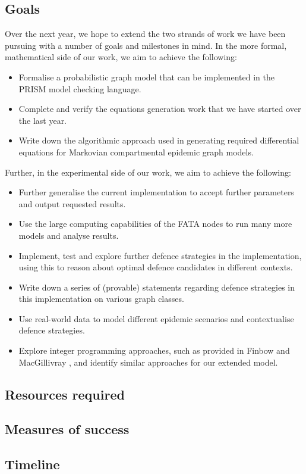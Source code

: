 \documentclass[../report.tex]{subfiles}
\begin{document}
\subsection{Goals}

Over the next year, we hope to extend the two strands of work we have been pursuing with a number of goals and milestones in mind. In the more formal, mathematical side of our work, we aim to achieve the following:
\begin{itemize}
	\item Formalise a probabilistic graph model that can be implemented in the PRISM model checking language.
	\item Complete and verify the equations generation work that we have started over the last year. 
	\item Write down the algorithmic approach used in generating required differential equations for Markovian compartmental epidemic graph models.
\end{itemize}

Further, in the experimental side of our work, we aim to achieve the following:
\begin{itemize}
	\item Further generalise the current implementation to accept further parameters and output requested results.
	\item Use the large computing capabilities of the FATA nodes to run many more models and analyse results.
	\item Implement, test and explore further defence strategies in the implementation, using this to reason about optimal defence candidates in different contexts.
	\item Write down a series of (provable) statements regarding defence strategies in this implementation on various graph classes.
	\item Use real-world data to model different epidemic scenarios and contextualise defence strategies.
	\item Explore integer programming approaches, such as provided in Finbow and MacGillivray \cite{finbow_2009}, and identify similar approaches for our extended model.
\end{itemize}


\subsection{Resources required}

\subsection{Measures of success}

\subsection{Timeline}
\end{document}
